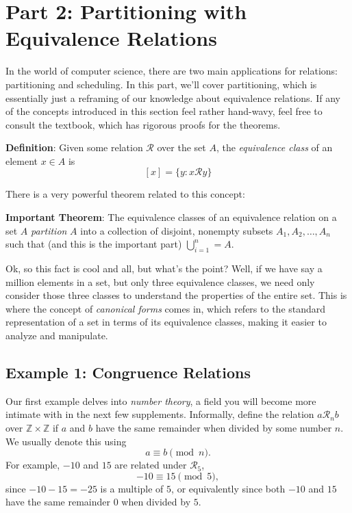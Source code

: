\documentclass{article}
\begin{document}
\section*{Part 2: Partitioning with Equivalence Relations}
    In the world of computer science, there are two main applications for relations: partitioning and scheduling. In this part, we'll cover partitioning, which is essentially just a reframing of our knowledge about equivalence relations. If any of the concepts introduced in this section feel rather hand-wavy, feel free to consult the textbook, which has rigorous proofs for the theorems.

    \vspace{2mm}
    \textbf{Definition}: Given some relation $\mathcal{R}$ over the set $A$, the \textit{equivalence class} of an element $x \in A$ is $$[x] = \{y : x \mathcal{R} y\}$$

    There is a very powerful theorem related to this concept:

    \vspace{2mm}
    \textbf{Important Theorem}: The equivalence classes of an equivalence relation on a set $A$ \textit{partition} $A$ into a collection of disjoint, nonempty subsets $A_{1}, A_{2}, \dots, A_{n}$ such that (and this is the important part) $\bigcup _{i = 1}^{n} = A$.


    \vspace{2mm}
    Ok, so this fact is cool and all, but what's the point? Well, if we have say a million elements in a set, but only three equivalence classes, we need only consider those three classes to understand the properties of the entire set. This is where the concept of \textit{canonical forms} comes in, which refers to the standard representation of a set in terms of its equivalence classes, making it easier to analyze and manipulate.

    \subsection*{Example 1: Congruence Relations}
        Our first example delves into \textit{number theory}, a field you will become more intimate with in the next few supplements. Informally, define the relation $a\mathcal{R}_{n}b$ over $\mathbb{Z} \times \mathbb{Z}$ if $a$ and $b$ have the same remainder when divided by some number $n$. We usually denote this using $$a \equiv b \pmod{n}.$$ For example, $-10$ and $15$ are related under $\mathcal{R}_{5}$, $$-10 \equiv 15 \pmod{5},$$ since $-10 - 15 = -25$ is a multiple of $5$, or equivalently since both $-10$ and $15$ have the same remainder $0$ when divided by $5$.
        
\end{document}
